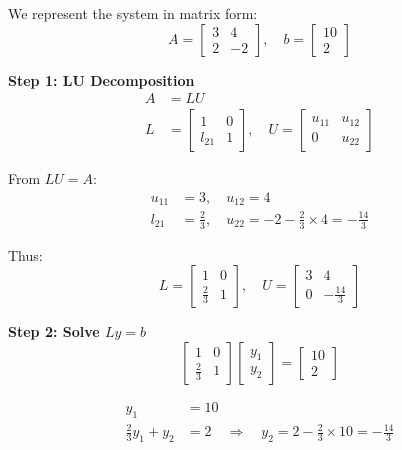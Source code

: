 \documentclass[journal]{IEEEtran}
\begin{document}
We represent the system in matrix form:
\[
A = \begin{bmatrix} 3 & 4 \\ 2 & -2 \end{bmatrix}, \quad b = \begin{bmatrix} 10 \\ 2 \end{bmatrix} \tag{7}
\]

\textbf{Step 1: LU Decomposition}
\begin{align}
    A &= LU \tag{8} \\
    L &= \begin{bmatrix} 1 & 0 \\ l_{21} & 1 \end{bmatrix}, \quad U = \begin{bmatrix} u_{11} & u_{12} \\ 0 & u_{22} \end{bmatrix} \tag{9}
\end{align}

From \(LU = A\):
\begin{align}
    u_{11} &= 3, \quad u_{12} = 4 \tag{10} \\
    l_{21} &= \frac{2}{3}, \quad u_{22} = -2 - \frac{2}{3} \times 4 = -\frac{14}{3} \tag{11}
\end{align}

Thus:
\[
L = \begin{bmatrix} 1 & 0 \\ \frac{2}{3} & 1 \end{bmatrix}, \quad U = \begin{bmatrix} 3 & 4 \\ 0 & -\frac{14}{3} \end{bmatrix} \tag{12}
\]

\textbf{Step 2: Solve \(Ly = b\)}
\[
\begin{bmatrix} 1 & 0 \\ \frac{2}{3} & 1 \end{bmatrix} \begin{bmatrix} y_1 \\ y_2 \end{bmatrix} = \begin{bmatrix} 10 \\ 2 \end{bmatrix} \tag{13}
\]

\begin{align}
    y_1 &= 10 \tag{14} \\
    \frac{2}{3}y_1 + y_2 &= 2 \quad \Rightarrow \quad y_2 = 2 - \frac{2}{3} \times 10 = -\frac{14}{3} \tag{15}
\end{align}
\end{document}
